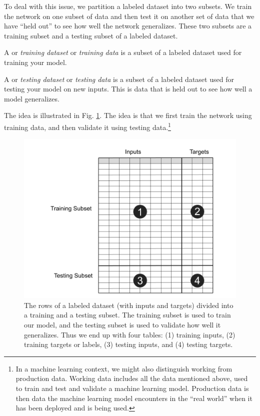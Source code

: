 To deal with this issue, we partition a labeled dataset into two subsets. We train the network on one subset of data and then test it on another set of data that we have ``held out'' to see how well the network generalizes. These two subsets are a training subset and a testing subset of a labeled dataset.

A  or \emph{training dataset} or \emph{training data} is a subset of a labeled dataset used for training your model.

A   or \emph{testing dataset} or \emph{testing data} is a subset of a labeled dataset used for testing your model on new inputs. This is data that is held out to see how well a model generalizes. 

The idea is illustrated in Fig. \ref{trainTest}. The idea is that we first train the network using training data, and then validate it using testing data.\footnote{In a machine learning context, we might also distinguish working from production data. Working data includes all the data mentioned above, used to train and test and validate a machine learning model. Production data is then data the machine learning model encounters in the ``real world'' when it has been deployed and is being used.} 

\begin{figure}[h]
\centering
\includegraphics[scale=0.3]{./images/trainTest2.png}
\caption[Jeff Yoshimi.]{The rows of a labeled dataset (with inputs and targets) divided into a training and a  testing subset. The training subset is used to train our model, and the testing subset is used to validate how well it generalizes. Thus we end up with four tables: (1) training inputs, (2)  training targets or labels, (3) testing inputs, and (4) testing targets. }
\label{trainTest}
\end{figure}

